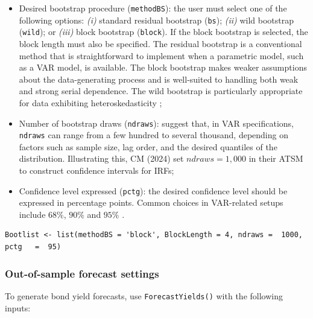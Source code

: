 \begin{itemize}
\tightlist
\item
  Desired bootstrap procedure (\texttt{methodBS}): the user must select one of the following options: \emph{(i)} standard residual bootstrap (\texttt{bs}); \emph{(ii)} wild bootstrap (\texttt{wild}); or \emph{(iii)} block bootstrap (\texttt{block}). If the block bootstrap is selected, the block length must also be specified.
  The residual bootstrap is a conventional method that is straightforward to implement when a parametric model, such as a VAR model, is available. The block bootstrap makes weaker assumptions about the data-generating process and is well-suited to handling both weak and strong serial dependence. The wild bootstrap is particularly appropriate for data exhibiting heteroskedasticity \citep{Horowitz2019};
\item
  Number of bootstrap draws (\texttt{ndraws}): \citet{KilianLutkepohl2017} suggest that, in VAR specifications, \texttt{ndraws} can range from a few hundred to several thousand, depending on factors such as sample size, lag order, and the desired quantiles of the distribution. Illustrating this, CM (2024) set \(ndraws= 1,000\) in their ATSM to construct confidence intervals for IRFs;
\item
  Confidence level expressed (\texttt{pctg}): the desired confidence level should be expressed in percentage points. Common choices in VAR-related setups include \(68\%\), \(90\%\) and \(95\%\) \citep{KilianLutkepohl2017}.
\end{itemize}

\begin{verbatim}
Bootlist <- list(methodBS = 'block', BlockLength = 4, ndraws =  1000, pctg   =  95)
\end{verbatim}

\subsubsection{Out-of-sample forecast settings}\label{S:SectionForecast}

To generate bond yield forecasts, use \texttt{ForecastYields()} with the following inputs:

